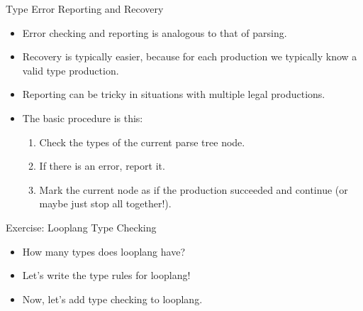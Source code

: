 \documentclass[]{beamer}
\begin{document}
\begin{frame}{Type Error Reporting and Recovery}
    \begin{itemize}[<+->]
        \item Error checking and reporting is analogous to that of
            parsing.
        \item Recovery is typically easier, because for each
            production we typically know a valid type production.
        \item Reporting can be tricky in situations with multiple
            legal productions.
        \item The basic procedure is this:
        \begin{enumerate}
            \item Check the types of the current parse tree node.
            \item If there is an error, report it.
            \item Mark the current node as if the production
                succeeded and continue (or maybe just stop all
                together!).
        \end{enumerate}
    \end{itemize}
\end{frame}

\begin{frame}{Exercise: Looplang Type Checking}
    \begin{itemize}[<+->]
        \item How many types does looplang have?
        \item Let's write the type rules for looplang!
        \item Now, let's add type checking to looplang.
    \end{itemize}
\end{frame}
\end{document}
